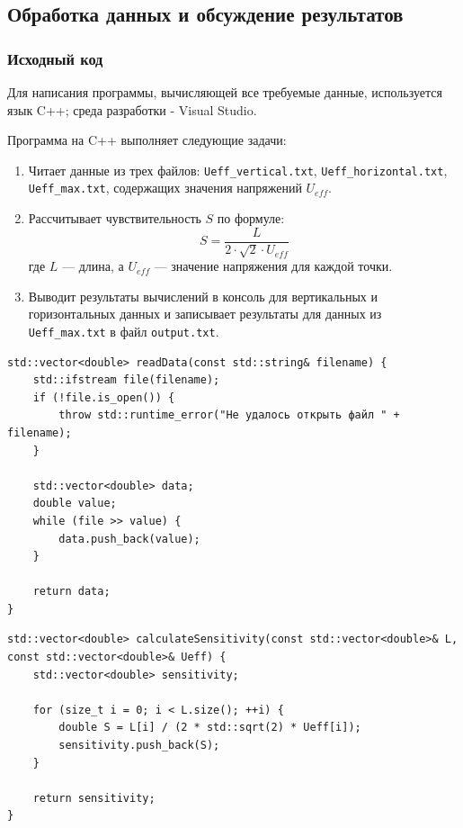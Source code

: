 \subsection{Обработка данных и обсуждение результатов}

\subsubsection{Исходный код}
Для написания программы, вычисляющей все требуемые данные, используется язык C++; среда разработки - Visual Studio.

Программа на C++ выполняет следующие задачи:
\begin{enumerate}
    \item Читает данные из трех файлов: \texttt{Ueff\_vertical.txt}, \texttt{Ueff\_horizontal.txt}, \texttt{Ueff\_max.txt}, содержащих значения напряжений \( U_{eff} \).
    \item Рассчитывает чувствительность \( S \) по формуле:
    \[
    S = \frac{L}{2 \cdot \sqrt{2} \cdot U_{eff}}
    \]
    где \( L \) — длина, а \( U_{eff} \) — значение напряжения для каждой точки.
    \item Выводит результаты вычислений в консоль для вертикальных и горизонтальных данных и записывает результаты для данных из \texttt{Ueff\_max.txt} в файл \texttt{output.txt}.
\end{enumerate}

\begin{lstlisting}[label=listing1, caption=Функция считывания данных из файла]
std::vector<double> readData(const std::string& filename) {
    std::ifstream file(filename);
    if (!file.is_open()) {
        throw std::runtime_error("Не удалось открыть файл " + filename);
    }

    std::vector<double> data;
    double value;
    while (file >> value) {
        data.push_back(value);
    }

    return data;
}

\end{lstlisting}

\begin{lstlisting}[label=listing2, caption=Функция расчета чувствительности]
std::vector<double> calculateSensitivity(const std::vector<double>& L, const std::vector<double>& Ueff) {
    std::vector<double> sensitivity;

    for (size_t i = 0; i < L.size(); ++i) {
        double S = L[i] / (2 * std::sqrt(2) * Ueff[i]);
        sensitivity.push_back(S);
    }

    return sensitivity;
}
\end{lstlisting}

